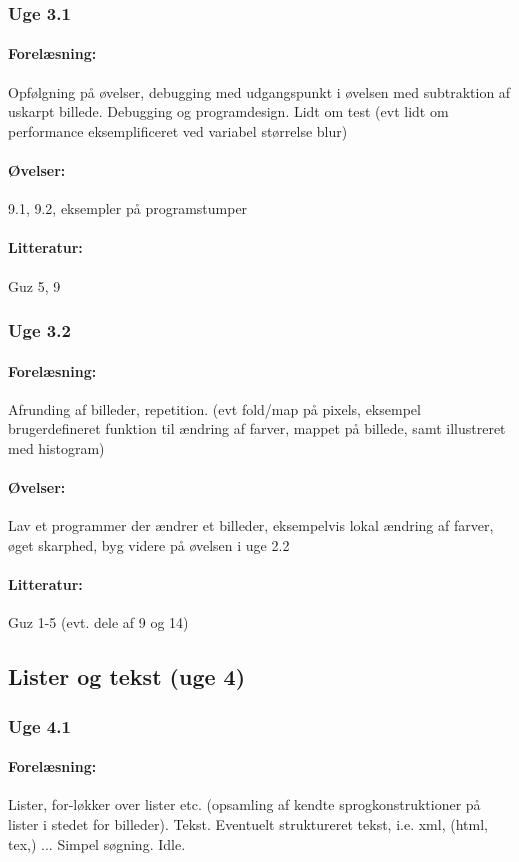 \documentclass[12pt]{article}
\begin{document}
\subsubsection{Uge 3.1}
\paragraph{Forelæsning:} 
Opfølgning på øvelser, debugging med udgangspunkt i øvelsen med subtraktion af uskarpt billede.
Debugging og programdesign. Lidt om test
(evt lidt om performance eksemplificeret ved variabel størrelse blur)


\paragraph{Øvelser:}
9.1, 9.2, eksempler på programstumper
\paragraph{Litteratur:} Guz 5, 9


\subsubsection{Uge 3.2}
\paragraph{Forelæsning:} 
Afrunding af billeder, repetition.
(evt fold/map på pixels, eksempel brugerdefineret funktion til ændring af farver, mappet på billede, samt illustreret med histogram)

\paragraph{Øvelser:}
Lav et programmer der ændrer et billeder,
eksempelvis lokal ændring af farver, øget skarphed,
byg videre på øvelsen i uge 2.2
\paragraph{Litteratur:} Guz 1-5 (evt. dele af 9 og 14)

\subsection{Lister og tekst (uge 4)}
\subsubsection{Uge 4.1}
\paragraph{Forelæsning:} 
Lister, for-løkker over lister etc. (opsamling af kendte sprogkonstruktioner på lister i stedet for billeder).
Tekst. Eventuelt struktureret tekst, i.e. xml, (html, tex,) ... Simpel søgning.
Idle.
\end{document}
